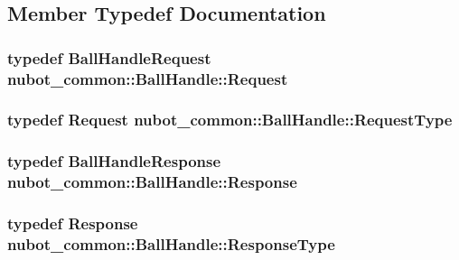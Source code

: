 \subsection{Member Typedef Documentation}
\hypertarget{structnubot__common_1_1BallHandle_a02af01a2f731b0fc249f1cf9df23a00e}{
\subsubsection[{Request}]{\setlength{\rightskip}{0pt plus 5cm}typedef {\bf Ball\-Handle\-Request} {\bf nubot\-\_\-common\-::\-Ball\-Handle\-::\-Request}}}\label{structnubot__common_1_1BallHandle_a02af01a2f731b0fc249f1cf9df23a00e}
\hypertarget{structnubot__common_1_1BallHandle_a942e61b75f91a2f8220764e8c3d6ad05}{
\subsubsection[{Request\-Type}]{\setlength{\rightskip}{0pt plus 5cm}typedef {\bf Request} {\bf nubot\-\_\-common\-::\-Ball\-Handle\-::\-Request\-Type}}}\label{structnubot__common_1_1BallHandle_a942e61b75f91a2f8220764e8c3d6ad05}
\hypertarget{structnubot__common_1_1BallHandle_a6c4cc1c333d5fe1cfc569ee22b68ba89}{
\subsubsection[{Response}]{\setlength{\rightskip}{0pt plus 5cm}typedef {\bf Ball\-Handle\-Response} {\bf nubot\-\_\-common\-::\-Ball\-Handle\-::\-Response}}}\label{structnubot__common_1_1BallHandle_a6c4cc1c333d5fe1cfc569ee22b68ba89}
\hypertarget{structnubot__common_1_1BallHandle_a9a45e8a947e8ad893d67e8526d98b3d5}{
\subsubsection[{Response\-Type}]{\setlength{\rightskip}{0pt plus 5cm}typedef {\bf Response} {\bf nubot\-\_\-common\-::\-Ball\-Handle\-::\-Response\-Type}}}\label{structnubot__common_1_1BallHandle_a9a45e8a947e8ad893d67e8526d98b3d5}


